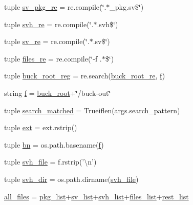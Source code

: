 \begin{DoxyCompactItemize}
\item 
tuple \hyperlink{namespacefb__utils_a9a64b83b1f280ce221da461c3a1e3f69}{sv\-\_\-pkg\-\_\-re} = re.\-compile(\char`\"{}.$\ast$\-\_\-pkg.\-sv\$\char`\"{})
\item 
tuple \hyperlink{namespacefb__utils_a5fafe279f7921831dd52acdc8a7fb0fc}{svh\-\_\-re} = re.\-compile(\char`\"{}.$\ast$.svh\$\char`\"{})
\item 
tuple \hyperlink{namespacefb__utils_a73e264c0b4abac47696cb9af5442ff77}{sv\-\_\-re} = re.\-compile(\char`\"{}.$\ast$.sv\$\char`\"{})
\item 
tuple \hyperlink{namespacefb__utils_aeede718a07634cd31cd013fae69a9722}{files\-\_\-re} = re.\-compile(\char`\"{}-\/f .$\ast$\$\char`\"{})
\item 
tuple \hyperlink{namespacefb__utils_acb42658c320fc5500109225f2150f3a5}{buck\-\_\-root\-\_\-reg} = re.\-search(\hyperlink{namespacefb__utils_aa82478ef5cba8a32c2c7b1354312ae94}{buck\-\_\-root\-\_\-re}, \hyperlink{namespacefb__utils_a1fd881f8821084c45c3ee6f19c7d4733}{f})
\item 
string \hyperlink{namespacefb__utils_a1fd881f8821084c45c3ee6f19c7d4733}{f} = \hyperlink{namespacefb__utils_ae7dbeeac0d9d06d0c8412bc84bd91eed}{buck\-\_\-root}+\char`\"{}/buck-\/out\char`\"{}
\item 
tuple \hyperlink{namespacefb__utils_a1f39868616143f0b1afc09fa31f902a8}{search\-\_\-matched} = Trueiflen(args.\-search\-\_\-pattern)
\item 
tuple \hyperlink{namespacefb__utils_a4a9b92731ce5163b4c224b682d51686a}{ext} = ext.\-rstrip()
\item 
tuple \hyperlink{namespacefb__utils_a7eac21abed8b5bb8ebd3450cb70c8a80}{bn} = os.\-path.\-basename(\hyperlink{namespacefb__utils_a1fd881f8821084c45c3ee6f19c7d4733}{f})
\item 
tuple \hyperlink{namespacefb__utils_a0b4a172289f8da0c591105716fec6a20}{svh\-\_\-file} = f.\-rstrip('\textbackslash{}n')
\item 
tuple \hyperlink{namespacefb__utils_a9a7552d7646f614253b152fd60621a1a}{svh\-\_\-dir} = os.\-path.\-dirname(\hyperlink{namespacefb__utils_a0b4a172289f8da0c591105716fec6a20}{svh\-\_\-file})
\item 
\hyperlink{namespacefb__utils_ad793aa0bb99875a76c0169394ef87e87}{all\-\_\-files} = \hyperlink{namespacefb__utils_a6887692f592843384a67fefe3b9144da}{pkg\-\_\-list}+\hyperlink{namespacefb__utils_ac57a5d2600819a0cd95a751784e809c9}{sv\-\_\-list}+\hyperlink{namespacefb__utils_a1ee53c4fb1a76769ec7757ab432117e0}{svh\-\_\-list}+\hyperlink{namespacefb__utils_abfa8ee516782c6f0fc32b4407b807f65}{files\-\_\-list}+\hyperlink{namespacefb__utils_a905045d2b7aefe95f688c8257c04e455}{rest\-\_\-list}
\end{DoxyCompactItemize}



